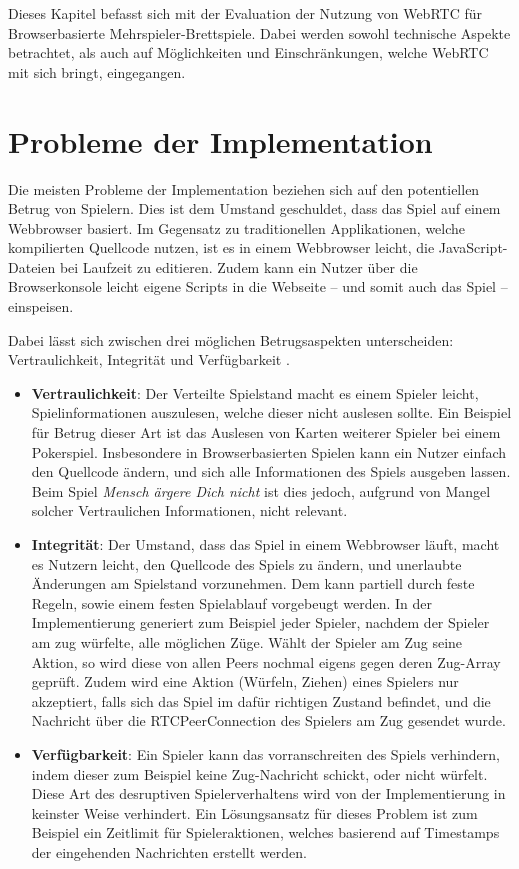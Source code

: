 Dieses Kapitel befasst sich mit der Evaluation der Nutzung von WebRTC für Browserbasierte Mehrspieler-Brettspiele. Dabei werden sowohl technische Aspekte betrachtet, als auch auf Möglichkeiten und Einschränkungen, welche WebRTC mit sich bringt, eingegangen.

\section{Probleme der Implementation}
Die meisten Probleme der Implementation beziehen sich auf den potentiellen Betrug von Spielern. Dies ist dem Umstand geschuldet, dass das Spiel auf einem Webbrowser basiert. Im Gegensatz zu \glqq{}traditionellen\grqq{} Applikationen, welche kompilierten Quellcode nutzen, ist es in einem Webbrowser leicht, die JavaScript-Dateien bei Laufzeit zu editieren. Zudem kann ein Nutzer über die Browserkonsole leicht eigene Scripts in die Webseite -- und somit auch das Spiel -- einspeisen.\par

Dabei lässt sich zwischen drei möglichen Betrugsaspekten unterscheiden: Vertraulichkeit, Integrität und Verfügbarkeit \cite{p2pchallenges}.
\begin{itemize}

\item \textbf{Vertraulichkeit}: Der Verteilte Spielstand macht es einem Spieler leicht, Spielinformationen auszulesen, welche dieser nicht auslesen sollte. Ein Beispiel für Betrug dieser Art ist das Auslesen von Karten weiterer Spieler bei einem Pokerspiel. Insbesondere in Browserbasierten Spielen kann ein Nutzer einfach den Quellcode ändern, und sich alle Informationen des Spiels ausgeben lassen. Beim Spiel \textit{Mensch ärgere Dich nicht} ist dies jedoch, aufgrund von Mangel solcher Vertraulichen Informationen, nicht relevant.

\item \textbf{Integrität}: Der Umstand, dass das Spiel in einem Webbrowser läuft, macht es Nutzern leicht, den Quellcode des Spiels zu ändern, und unerlaubte Änderungen am Spielstand vorzunehmen. Dem kann partiell durch feste Regeln, sowie einem festen Spielablauf vorgebeugt werden. In der Implementierung generiert zum Beispiel jeder Spieler, nachdem der Spieler am zug würfelte, alle möglichen Züge. Wählt der Spieler am Zug seine Aktion, so wird diese von allen Peers nochmal eigens gegen deren Zug-Array geprüft. Zudem wird eine Aktion (Würfeln, Ziehen) eines Spielers  nur akzeptiert, falls sich das Spiel im dafür richtigen Zustand befindet, und die Nachricht über die RTCPeerConnection des Spielers am Zug gesendet wurde.

\item \textbf{Verfügbarkeit}: Ein Spieler kann das vorranschreiten des Spiels verhindern, indem dieser zum Beispiel keine Zug-Nachricht schickt, oder nicht würfelt. Diese Art des desruptiven Spielerverhaltens wird von der Implementierung in keinster Weise verhindert. Ein Lösungsansatz für dieses Problem ist zum Beispiel ein Zeitlimit für Spieleraktionen, welches basierend auf Timestamps der eingehenden Nachrichten erstellt werden.

\end{itemize}

